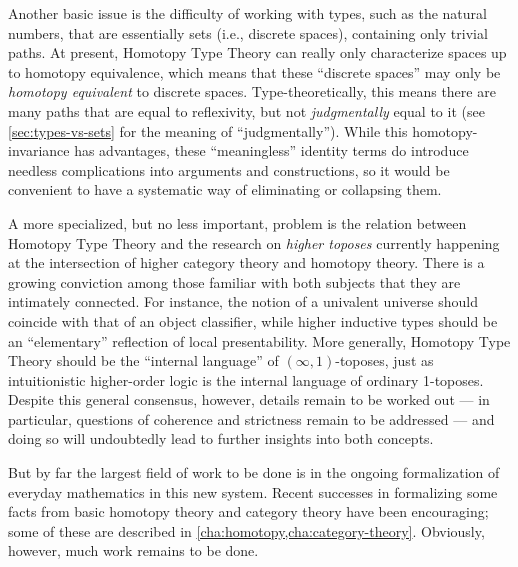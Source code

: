 Another basic issue is the difficulty of working with types, such as the natural numbers, that are essentially sets (i.e., discrete spaces),
%
containing only trivial paths.
At present, Homotopy Type Theory can really only characterize spaces up to homotopy equivalence, which means that these ``discrete spaces'' may only be \emph{homotopy equivalent} to discrete spaces.
Type-theoretically, this means there are many paths that are equal to reflexivity, but not \emph{judgmentally} equal to it (see \cref{sec:types-vs-sets} for the meaning of ``judgmentally'').
While this homotopy-invariance has advantages, these ``meaningless'' identity terms do introduce needless complications into arguments and constructions, so it would be convenient to have a systematic way of eliminating or collapsing them.

A more specialized, but no less important, problem is the relation between Homotopy Type Theory and the research on \emph{higher toposes}%
currently happening at the intersection of higher category theory and homotopy theory.
There is a growing conviction among those familiar with both subjects that they are intimately connected.
For instance, the notion of a univalent universe should coincide with that of an object classifier, while higher inductive types should be an ``elementary'' reflection of local presentability.
More generally, Homotopy Type Theory should be the ``internal language'' of $(\infty,1)$-toposes, just as intuitionistic higher-order logic is the internal language of ordinary 1-toposes.
Despite this general consensus, however, details remain to be worked out --- in particular, questions of coherence and strictness remain to be addressed  --- and doing so will undoubtedly lead to further insights into both concepts.

%
But by far the largest field of work to be done is in the ongoing formalization of everyday mathematics in this new system.
Recent successes in formalizing some facts from basic homotopy theory and category theory have been encouraging; some of these are described in \cref{cha:homotopy,cha:category-theory}.
Obviously, however, much work remains to be done.

%

